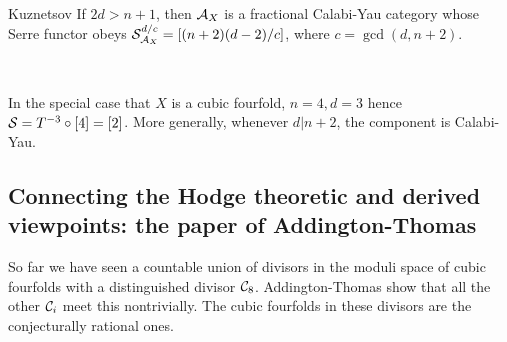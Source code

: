 \begin{corollary}{Kuznetsov}{}
    If $2d>n+1$, then $\mathcal{A}_X$ is a fractional Calabi-Yau category whose Serre functor obeys $\mathcal{S}_{\mathcal{A}_X}^{d/c}=[(n+2)(d-2)/c]$, where $c=\gcd(d,n+2)$.

    ~

    In the special case that $X$ is a cubic fourfold, $n=4,d=3$ hence $\mathcal{S}=T^{-3}\circ [4]=[2]$. More generally, whenever $d|n+2$, the component is Calabi-Yau.
\end{corollary}

\subsection{Connecting the Hodge theoretic and derived viewpoints: the paper of Addington-Thomas}

So far we have seen a countable union of divisors in the moduli space of cubic fourfolds with a distinguished divisor $\mathcal{C}_8$. Addington-Thomas show that all the other $\mathcal{C}_i$ meet this nontrivially. The cubic fourfolds in these divisors are the conjecturally rational ones. 









